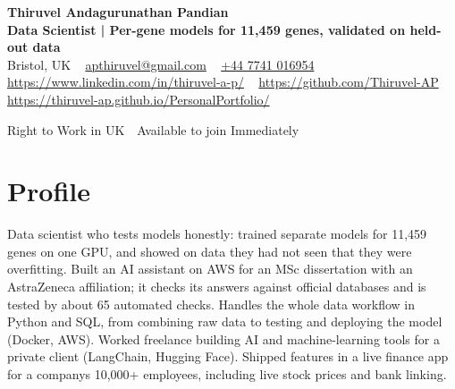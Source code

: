 \documentclass[a4paper,11pt]{article}
\begin{document}
\begin{center}
  {\LARGE\bfseries Thiruvel Andagurunathan Pandian} \\[3pt]
  {\color{headernavy}\small\textbf{Data Scientist | Per-gene models for 11,459 genes, validated on held-out data}} \\[3pt]
  {\small
  Bristol, UK\nobreak\ \,\textbar\, \href{mailto:apthiruvel@gmail.com}{apthiruvel@gmail.com}\nobreak\ \,\textbar\, \href{tel:+447741016954}{+44 7741 016954}\nobreak\ \,\textbar\, \href{https://www.linkedin.com/in/thiruvel-a-p/}{https://www.linkedin.com/in/thiruvel-a-p/}\nobreak\ \,\textbar\, \href{https://github.com/Thiruvel-AP}{https://github.com/Thiruvel-AP}\nobreak\ \,\textbar\, \href{https://thiruvel-ap.github.io/PersonalPortfolio/}{https://thiruvel-ap.github.io/PersonalPortfolio/}}\par\vspace{4pt}
  \noindent{} Right to Work in UK \,\textbar\, Available to join Immediately
\end{center}

\section{Profile}
Data scientist who tests models honestly: trained separate models for 11,459 genes on one GPU, and showed on data they had not seen that they were overfitting. Built an AI assistant on AWS for an MSc dissertation with an AstraZeneca affiliation; it checks its answers against official databases and is tested by about 65 automated checks. Handles the whole data workflow in Python and SQL, from combining raw data to testing and deploying the model (Docker, AWS). Worked freelance building AI and machine-learning tools for a private client (LangChain, Hugging Face). Shipped features in a live finance app for a company\textquotesingle{}s 10,000+ employees, including live stock prices and bank linking.
\end{document}
